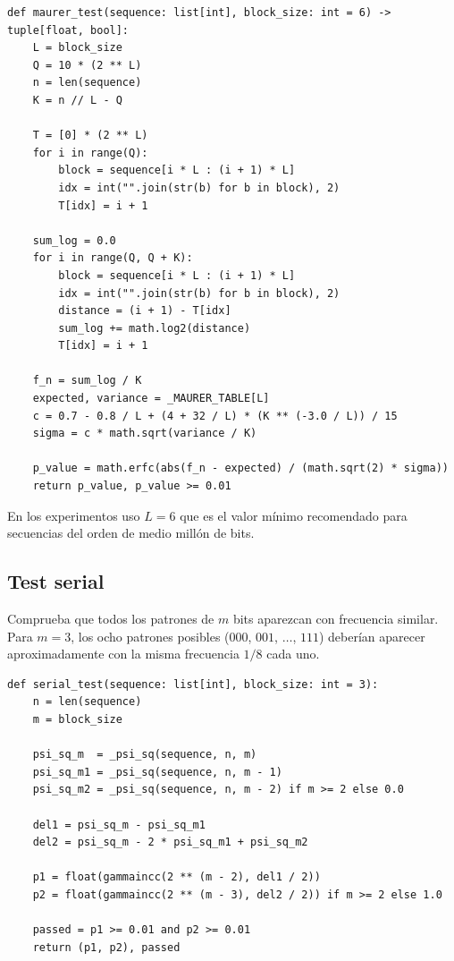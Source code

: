 \begin{lstlisting}[style=Python,caption={Test universal de Maurer (extracto, \texttt{src/tests\_nist/maurer.py}).}]
def maurer_test(sequence: list[int], block_size: int = 6) -> tuple[float, bool]:
    L = block_size
    Q = 10 * (2 ** L)
    n = len(sequence)
    K = n // L - Q

    T = [0] * (2 ** L)
    for i in range(Q):
        block = sequence[i * L : (i + 1) * L]
        idx = int("".join(str(b) for b in block), 2)
        T[idx] = i + 1

    sum_log = 0.0
    for i in range(Q, Q + K):
        block = sequence[i * L : (i + 1) * L]
        idx = int("".join(str(b) for b in block), 2)
        distance = (i + 1) - T[idx]
        sum_log += math.log2(distance)
        T[idx] = i + 1

    f_n = sum_log / K
    expected, variance = _MAURER_TABLE[L]
    c = 0.7 - 0.8 / L + (4 + 32 / L) * (K ** (-3.0 / L)) / 15
    sigma = c * math.sqrt(variance / K)

    p_value = math.erfc(abs(f_n - expected) / (math.sqrt(2) * sigma))
    return p_value, p_value >= 0.01
\end{lstlisting}

En los experimentos uso $L = 6$ que es el valor mínimo recomendado para secuencias del orden de medio millón de bits.

\subsection{Test serial}

Comprueba que todos los patrones de $m$ bits aparezcan con frecuencia similar. Para $m = 3$, los ocho patrones posibles ($000$, $001$, $\ldots$, $111$) deberían aparecer
aproximadamente con la misma frecuencia $1/8$ cada uno.

\begin{lstlisting}[style=Python,caption={Test serial (\texttt{src/tests\_nist/serial.py}).}]
def serial_test(sequence: list[int], block_size: int = 3):
    n = len(sequence)
    m = block_size

    psi_sq_m  = _psi_sq(sequence, n, m)
    psi_sq_m1 = _psi_sq(sequence, n, m - 1)
    psi_sq_m2 = _psi_sq(sequence, n, m - 2) if m >= 2 else 0.0

    del1 = psi_sq_m - psi_sq_m1
    del2 = psi_sq_m - 2 * psi_sq_m1 + psi_sq_m2

    p1 = float(gammaincc(2 ** (m - 2), del1 / 2))
    p2 = float(gammaincc(2 ** (m - 3), del2 / 2)) if m >= 2 else 1.0

    passed = p1 >= 0.01 and p2 >= 0.01
    return (p1, p2), passed
\end{lstlisting}


